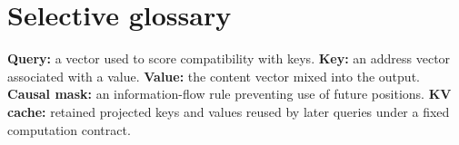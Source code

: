 \section*{Selective glossary}
\textbf{Query:} a vector used to score compatibility with keys.
\textbf{Key:} an address vector associated with a value.
\textbf{Value:} the content vector mixed into the output.
\textbf{Causal mask:} an information-flow rule preventing use of future positions.
\textbf{KV cache:} retained projected keys and values reused by later queries under a fixed computation contract.
